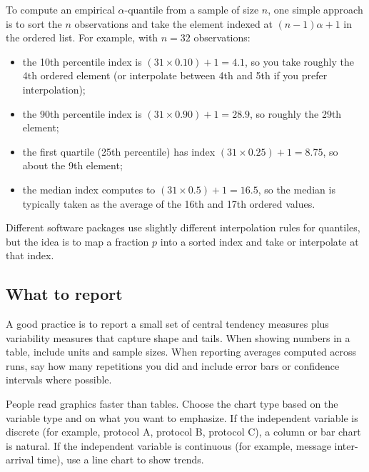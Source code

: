 To compute an empirical $\alpha$-quantile from a sample of size $n$, one simple approach is to sort the $n$ observations and take the element indexed at $(n-1)\alpha+1$ in the ordered list. For example, with $n=32$ observations:
\begin{itemize}
    \item the 10th percentile index is $(31\times 0.10)+1=4.1$, so you take roughly the 4th ordered element (or interpolate between 4th and 5th if you prefer interpolation); 
    \item the 90th percentile index is $(31\times 0.90)+1=28.9$, so roughly the 29th element; 
    \item the first quartile (25th percentile) has index $(31\times 0.25)+1=8.75$, so about the 9th element; 
    \item the median index computes to $(31\times 0.5)+1=16.5$, so the median is typically taken as the average of the 16th and 17th ordered values.
\end{itemize}
Different software packages use slightly different interpolation rules for quantiles, but the idea is to map a fraction $p$ into a sorted index and take or interpolate at that index.

\subsection{What to report}
A good practice is to report a small set of central tendency measures plus variability measures that capture shape and tails.
When showing numbers in a table, include units and sample sizes. When reporting averages computed across runs, say how many repetitions you did and include error bars or confidence intervals where possible.

People read graphics faster than tables. Choose the chart type based on the variable type and on what you want to emphasize.
If the independent variable is discrete (for example, protocol A, protocol B, protocol C), a column or bar chart is natural. If the independent variable is continuous (for example, message inter-arrival time), use a line chart to show trends.
